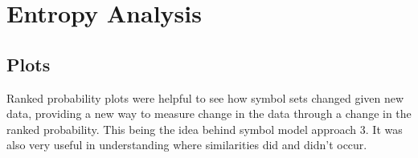 

%
%
%
%
%


\section{Entropy Analysis}
\subsection{Plots}
Ranked probability plots were helpful to see how symbol sets changed given new data, providing a new way to measure change in the data through a change in the ranked probability. This being the idea behind symbol model approach 3. It was also very useful in understanding where similarities did and didn't occur.\\


